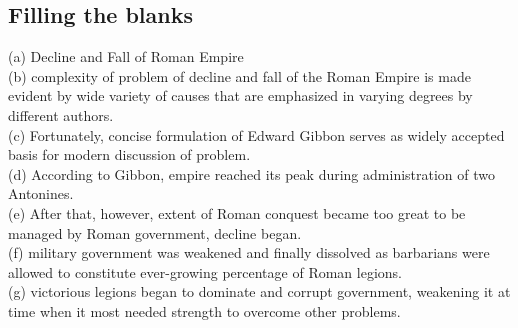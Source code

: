 \documentclass[paper=a4, fontsize=11pt]{scrartcl} %
\numberwithin{equation}{section} %
\numberwithin{figure}{section} %
\numberwithin{table}{section} %
\begin{document}
	\subsection{Filling the blanks}
		(a) \underline{} Decline and Fall of \underline{} Roman Empire\\
		(b) \underline{} complexity of \underline{} problem of \underline{} decline and fall of the Roman Empire is made evident by \underline{} wide variety of causes that are emphasized in varying degrees by \makebox[1cm]{\hrulefill}different authors.\\
		(c) Fortunately, \underline{} concise formulation of Edward Gibbon serves as \underline{} widely accepted basis for \makebox[1cm]{\hrulefill} modern discussion of \underline{} problem.\\
		(d) According to Gibbon,\underline{} empire reached its peak during \underline{} administration of \makebox[1cm]{\hrulefill} two Antonines.\\
		(e) After that, however, \underline{}extent of \makebox[1cm]{\hrulefill} Roman conquest became too great to be managed by \makebox[1cm]{\hrulefill} Roman government,\underline{} decline began.\\
		(f) \underline{} military government was weakened and finally dissolved as \makebox[1cm]{\hrulefill} barbarians were allowed to constitute \underline{} ever-growing percentage of \underline{} Roman legions.\\
		(g) \underline{} victorious legions began to dominate and corrupt \underline{} government, weakening it at \underline{} time when it most needed \underline{} strength to overcome \makebox[1cm]{\hrulefill} other problems.
\end{document}

